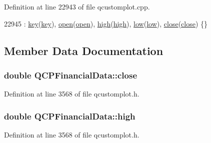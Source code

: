 Definition at line 22943 of file qcustomplot.\+cpp.


\begin{DoxyCode}
22945     : \hyperlink{class_q_c_p_financial_data_a18bc92126f28c214b05b0161e5f5958b}{key}(\hyperlink{class_q_c_p_financial_data_a18bc92126f28c214b05b0161e5f5958b}{key}), \hyperlink{class_q_c_p_financial_data_a3059e1e1fbcb9fd243fde0450f238032}{open}(\hyperlink{class_q_c_p_financial_data_a3059e1e1fbcb9fd243fde0450f238032}{open}), \hyperlink{class_q_c_p_financial_data_a299a4b241296fb6cd1baf5ab03f7126a}{high}(\hyperlink{class_q_c_p_financial_data_a299a4b241296fb6cd1baf5ab03f7126a}{high}), \hyperlink{class_q_c_p_financial_data_aecce0fb45a115e3f3a25eea78491ac16}{low}(\hyperlink{class_q_c_p_financial_data_aecce0fb45a115e3f3a25eea78491ac16}{low}), 
      \hyperlink{class_q_c_p_financial_data_a45e9b96944c4a08ea6c82a72d3d22df2}{close}(\hyperlink{class_q_c_p_financial_data_a45e9b96944c4a08ea6c82a72d3d22df2}{close}) \{\}
\end{DoxyCode}


\subsection{Member Data Documentation}
\hypertarget{class_q_c_p_financial_data_a45e9b96944c4a08ea6c82a72d3d22df2}{}
\subsubsection[{close}]{\setlength{\rightskip}{0pt plus 5cm}double Q\+C\+P\+Financial\+Data\+::close}\label{class_q_c_p_financial_data_a45e9b96944c4a08ea6c82a72d3d22df2}


Definition at line 3568 of file qcustomplot.\+h.

\hypertarget{class_q_c_p_financial_data_a299a4b241296fb6cd1baf5ab03f7126a}{}
\subsubsection[{high}]{\setlength{\rightskip}{0pt plus 5cm}double Q\+C\+P\+Financial\+Data\+::high}\label{class_q_c_p_financial_data_a299a4b241296fb6cd1baf5ab03f7126a}


Definition at line 3568 of file qcustomplot.\+h.

